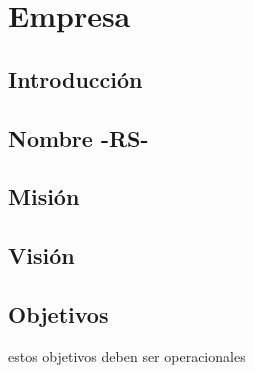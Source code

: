 \chapter{Empresa}

\section{Introducción}

\newpage

\section{Nombre -RS-}


\section{Misión}


\section{Visión}

\newpage

\section{Objetivos}

estos objetivos deben ser operacionales

\newpage


